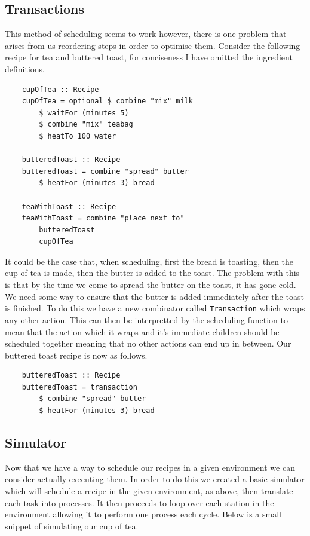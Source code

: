 \documentclass[11pt]{article}
\begin{document}
\subsection{Transactions}

This method of scheduling seems to work however, there is one problem that arises from us
reordering steps in order to optimise them. Consider the following recipe for tea and buttered toast,
for conciseness I have omitted the ingredient definitions.

\begin{lstlisting}
    cupOfTea :: Recipe
    cupOfTea = optional $ combine "mix" milk
        $ waitFor (minutes 5)
        $ combine "mix" teabag
        $ heatTo 100 water

    butteredToast :: Recipe
    butteredToast = combine "spread" butter
        $ heatFor (minutes 3) bread

    teaWithToast :: Recipe
    teaWithToast = combine "place next to"
        butteredToast
        cupOfTea
\end{lstlisting}

It could be the case that, when scheduling, first the bread is toasting, then the cup of tea is
made, then the butter is added to the toast. The problem with this is that by the time we come
to spread the butter on the toast, it has gone cold. We need some way to ensure that the butter
is added immediately after the toast is finished. To do this we have a new combinator called
\texttt{Transaction} which wraps any other action. This can then be interpretted by the scheduling
function to mean that the action which it wraps and it's immediate children should be scheduled
together meaning that no other actions can end up in between. Our buttered toast recipe is now
as follows.

\begin{lstlisting}
    butteredToast :: Recipe
    butteredToast = transaction
        $ combine "spread" butter
        $ heatFor (minutes 3) bread
\end{lstlisting}

\subsection{Simulator}

Now that we have a way to schedule our recipes in a given environment we can consider actually
executing them. In order to do this we created a basic simulator which will schedule a recipe
in the given environment, as above, then translate each task into processes. It then proceeds
to loop over each station in the environment allowing it to perform one process each cycle.
Below is a small snippet of simulating our cup of tea.
\end{document}
